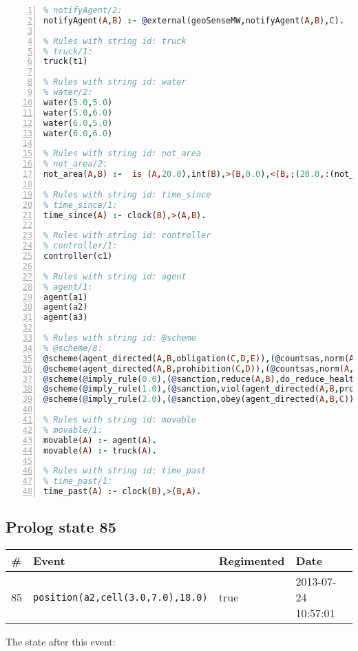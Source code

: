 \documentclass[11pt]{article}\usepackage[utf8]{inputenc}\usepackage{geometry}
\begin{document}
\begin{lstlisting}[language=Prolog, numbers=left]
% Rules with string id: notifyAgent
% notifyAgent/2:
notifyAgent(A,B) :- @external(geoSenseMW,notifyAgent(A,B),C).

% Rules with string id: truck
% truck/1:
truck(t1)

% Rules with string id: water
% water/2:
water(5.0,5.0)
water(5.0,6.0)
water(6.0,5.0)
water(6.0,6.0)

% Rules with string id: not_area
% not_area/2:
not_area(A,B) :-  is (A,20.0),int(B),>(B,0.0),<(B,;(20.0,:(not_area(A,B), is (-(B),20.0)))),int(A),>(A,0.0),<(A,;(20.0,:(area(A,B),-(int(A))))),int(B),>(A,0.0),>(B,0.0),<(A,21.0),<(B,21.0).

% Rules with string id: time_since
% time_since/1:
time_since(A) :- clock(B),>(A,B).

% Rules with string id: controller
% controller/1:
controller(c1)

% Rules with string id: agent
% agent/1:
agent(a1)
agent(a2)
agent(a3)

% Rules with string id: @scheme
% @scheme/8:
@scheme(agent_directed(A,B,obligation(C,D,E)),(@countsas,norm(A,B,F,obligation(C,D,E)),F),false,(listTrue(C)),(time_past(D)),false,[plus(viol(agent_directed(A,B,obligation(C,D,E))))|[]],[plus(obey(agent_directed(A,B,obligation(C,D,E))))|[]])
@scheme(agent_directed(A,B,prohibition(C,D)),(@countsas,norm(A,B,E,prohibition(C,D)),E),(listTrue(C)),false,(false),false,[plus(viol(agent_directed(A,B,prohibition(C,D))))|[]],[plus(obey(agent_directed(A,B,prohibition(C,D))))|[]])
@scheme(@imply_rule(0.0),(@sanction,reduce(A,B),do_reduce_health(A,B),notifyAgent(A,changed(status))),true,false,false,false,[min(reduce(A,B))|[]],[])
@scheme(@imply_rule(1.0),(@sanction,viol(agent_directed(A,B,prohibition(C,D))),do_sanction(D)),true,false,false,false,[min(viol(agent_directed(A,B,prohibition(C,D))))|[]],[])
@scheme(@imply_rule(2.0),(@sanction,obey(agent_directed(A,B,C))),true,false,false,false,[min(obey(agent_directed(A,B,C)))|[]],[])

% Rules with string id: movable
% movable/1:
movable(A) :- agent(A).
movable(A) :- truck(A).

% Rules with string id: time_past
% time_past/1:
time_past(A) :- clock(B),>(B,A).

\end{lstlisting}
\clearpage 
\subsection{Prolog state 85}
\begin{table}[ht]
\centering 
\begin{tabular}{l l l l} 
\textbf{\#} & \textbf{Event} & \textbf{Regimented} & \textbf{Date} \\ [0.5ex] 
\hline
85&\texttt{position(a2,cell(3.0,7.0),18.0)}&true&2013-07-24 10:57:01\\ [1ex] \hline\end{tabular}
\end{table}
The state after this event:
\end{document}
